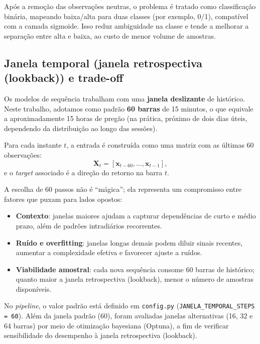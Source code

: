 Após a remoção das observações neutras, o problema é tratado como classificação binária,
mapeando baixa/alta para duas classes (por exemplo, 0/1), compatível com a camada sigmoide.
Isso reduz ambiguidade na classe e tende a melhorar a separação entre alta e baixa,
ao custo de menor volume de amostras.

\subsection{Janela temporal (janela retrospectiva (lookback)) e trade-off}
Os modelos de sequência trabalham com uma \textbf{janela deslizante} de histórico.
Neste trabalho, adotamos como padrão \textbf{60 barras} de 15 minutos,
o que equivale a aproximadamente 15 horas de pregão
(na prática, próximo de dois dias úteis, dependendo da distribuição ao longo das sessões).

Para cada instante $t$, a entrada é construída como uma matriz com as últimas 60 observações:
\[
\mathbf{X}_t = [\mathbf{x}_{t-60}, \ldots, \mathbf{x}_{t-1}],
\]
e o \emph{target} associado é a direção do retorno na barra $t$.

A escolha de 60 passos não é “mágica”; ela representa um compromisso entre fatores que puxam
para lados opostos:

\begin{itemize}
  \item \textbf{Contexto}: janelas maiores ajudam a capturar dependências de curto e médio prazo,
        além de padrões intradiários recorrentes.
  \item \textbf{Ruído e overfitting}: janelas longas demais podem diluir sinais recentes,
        aumentar a complexidade efetiva e favorecer ajuste a ruídos.
  \item \textbf{Viabilidade amostral}: cada nova sequência consome 60 barras de histórico;
        quanto maior a janela retrospectiva (lookback), menor o número de amostras disponíveis.
\end{itemize}

No \textit{pipeline}, o valor padrão está definido em \texttt{config.py}
(\texttt{JANELA\_TEMPORAL\_STEPS = 60}).
Além da janela padrão (60), foram avaliadas janelas alternativas (16, 32 e 64 barras) por meio de otimização bayesiana (Optuna), a fim de verificar sensibilidade do desempenho à janela retrospectiva (lookback).


